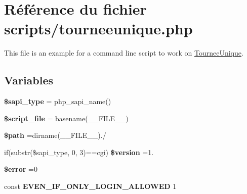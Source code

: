 \hypertarget{scripts_2tourneeunique_8php}{}\section{Référence du fichier scripts/tourneeunique.php}
\label{scripts_2tourneeunique_8php}


This file is an example for a command line script to work on \hyperlink{classTourneeUnique}{Tournee\+Unique}.  


\subsection*{Variables}
\begin{DoxyCompactItemize}
\item 
\mbox{\label{scripts_2tourneeunique_8php_a86e02f00a36d0fcbf274de973b2640d0}} 
{\bfseries \$sapi\+\_\+type} = php\+\_\+sapi\+\_\+name()
\item 
\mbox{\label{scripts_2tourneeunique_8php_a97b9f047572d6c50f29fbea522f6c17e}} 
{\bfseries \$script\+\_\+file} = basename(\+\_\+\+\_\+\+F\+I\+L\+E\+\_\+\+\_\+)
\item 
\mbox{\label{scripts_2tourneeunique_8php_a0a4baf0b22973c07685c3981f0d17fc4}} 
{\bfseries \$path} =dirname(\+\_\+\+\_\+\+F\+I\+L\+E\+\_\+\+\_\+).\textquotesingle{}/\textquotesingle{}
\item 
\mbox{\label{scripts_2tourneeunique_8php_a0a351317886caa2358df1658880c0c78}} 
if(substr(\$sapi\+\_\+type, 0, 3)==\textquotesingle{}cgi\textquotesingle{}) {\bfseries \$version} =\textquotesingle{}1.\textquotesingle{}
\item 
\mbox{\label{scripts_2tourneeunique_8php_aeba2ab722cedda53dbb7ec1a59f45550}} 
{\bfseries \$error} =0
\item 
\mbox{\label{scripts_2tourneeunique_8php_a2b87986264c1ca3cddb96a106af7b37a}} 
const {\bfseries E\+V\+E\+N\+\_\+\+I\+F\+\_\+\+O\+N\+L\+Y\+\_\+\+L\+O\+G\+I\+N\+\_\+\+A\+L\+L\+O\+W\+ED} 1
\item 
\mbox{\label{scripts_2tourneeunique_8php_a49a8a4009b02e49717caa88b128affc5}} 

\end{DoxyCompactItemize}
